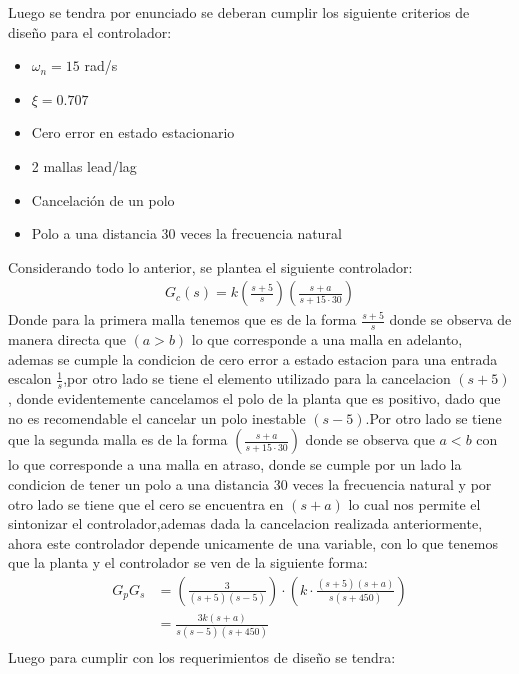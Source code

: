 \documentclass[
  11pt,
  letterpaper,
   addpoints,
   answers
  ]{exam}
\begin{document}
\begin{questions}
\begin{solution}
\begin{center}
\end{center}
Luego se tendra por enunciado se deberan cumplir los siguiente criterios de diseño para el controlador:
\begin{itemize}
    \item $\omega_n=15$ rad/s
    \item $\xi=0.707$
    \item Cero error en estado estacionario
    \item 2 mallas lead/lag
    \item Cancelación de un polo
    \item Polo a una distancia 30 veces la frecuencia natural
\end{itemize}
Considerando todo lo anterior, se plantea el siguiente controlador:
\begin{align}
    G_{c}(s)= k \left(\frac{s+5}{s}\right)\left(\frac{s+a}{s+15\cdot 30}\right)
\end{align}
Donde para la primera malla tenemos que es de la forma $\frac{s+5}{s}$ donde se observa de manera directa que $(a>b)$ lo que corresponde a una malla en adelanto, ademas se cumple la condicion de cero error a estado estacion para una entrada escalon $\frac{1}{s}$,por otro lado se tiene el elemento utilizado para la cancelacion $(s+5)$, donde evidentemente cancelamos el polo de la planta que es positivo, dado que no es recomendable el cancelar un polo inestable $(s-5)$.Por otro lado se tiene que la segunda malla es de la forma $\left(\frac{s+a}{s+15\cdot 30}\right)$ donde se observa que $a<b$ con lo que corresponde a una malla en atraso, donde se cumple por un lado la condicion de tener un polo a una distancia 30 veces la frecuencia natural y por otro lado se tiene que el cero se encuentra en $(s+a)$ lo cual nos permite el sintonizar el controlador,ademas dada la cancelacion realizada anteriormente, ahora este controlador depende unicamente de una variable, con lo que tenemos que la planta y el controlador se ven de la siguiente forma:
\begin{align}
    G_{p}G_{s} &= \left(\frac{3}{(s+5)(s-5)}\right)\cdot \left(k \cdot \frac{(s+5)(s+a)}{s(s+450)}\right)\\
              &= \frac{3k(s+a)}{s(s-5)(s+450)}\\
\end{align}
Luego para cumplir con los requerimientos de diseño se tendra:

\end{solution}
\end{questions}
\end{document}
